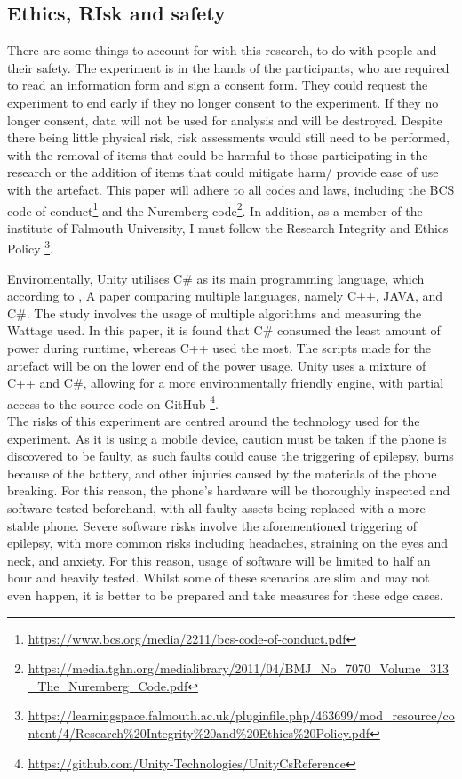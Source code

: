 \documentclass[conference]{IEEEtran}
\begin{document}
\subsection{Ethics, RIsk and safety}
There are some things to account for with this research, to do with people and their safety. The experiment is in the hands of the participants, who are required to read an information form and sign a consent form. They could request the experiment to end early if they no longer consent to the experiment. If they no longer consent, data will not be used for analysis and will be destroyed. Despite there being little physical risk, risk assessments would still need to be performed, with the removal of items that could be harmful to those participating in the research or the addition of items that could mitigate harm/ provide ease of use with the artefact. This paper will adhere to all codes and laws, including the BCS code of conduct\footnote{\url{https://www.bcs.org/media/2211/bcs-code-of-conduct.pdf}} and the Nuremberg code\footnote{\url{https://media.tghn.org/medialibrary/2011/04/BMJ_No_7070_Volume_313_The_Nuremberg_Code.pdf}}. In addition, as a member of the institute of Falmouth University, I must follow the Research Integrity and Ethics Policy \footnote{\url{https://learningspace.falmouth.ac.uk/pluginfile.php/463699/mod_resource/content/4/Research\%20Integrity\%20and\%20Ethics\%20Policy.pdf}}. 

Enviromentally, Unity utilises C\# as its main programming language, which according to \cite{Jain2020}, A paper comparing multiple languages, namely C++, JAVA, and C\#. The study involves the usage of multiple algorithms and measuring the Wattage used. In this paper, it is found that C\# consumed the least amount of power during runtime, whereas C++ used the most. The scripts made for the artefact will be on the lower end of the power usage. Unity uses a mixture of C++ and C\#, allowing for a more environmentally friendly engine, with partial access to the source code on GitHub \footnote{\url{https://github.com/Unity-Technologies/UnityCsReference}}.\\

 The risks of this experiment are centred around the technology used for the experiment. As it is using a mobile device, caution must be taken if the phone is discovered to be faulty, as such faults could cause the triggering of epilepsy, burns because of the battery, and other injuries caused by the materials of the phone breaking. For this reason, the phone’s hardware will be thoroughly inspected and software tested beforehand, with all faulty assets being replaced with a more stable phone. Severe software risks involve the aforementioned triggering of epilepsy, with more common risks including headaches, straining on the eyes and neck, and anxiety. For this reason, usage of software will be limited to half an hour and heavily tested. Whilst some of these scenarios are slim and may not even happen, it is better to be prepared and take measures for these edge cases.\\
\end{document}
